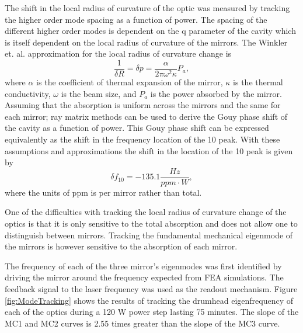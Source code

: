 The shift in the local radius of curvature of the optic was measured by 
tracking the higher order mode spacing as a function of power.  
The spacing of the different higher order modes is dependent on the q 
parameter of the cavity which is itself dependent on the local radius of 
curvature of the mirrors.  
The Winkler et. al.\cite{winkler_heating_1991} approximation for the local radius of 
curvature change is
\begin{equation}
	\frac{1}{\delta R}=\delta p=\frac{\alpha}{2\pi\omega^2\kappa}P_a,
\end{equation}
where $\alpha$ is the coefficient of thermal expansion of the mirror,  
$\kappa$ is the thermal conductivity, $\omega$ is the beam size, and 
$P_a$ is the power absorbed by the mirror.  
Assuming that the absorption is uniform across the mirrors and the same for 
each mirror; ray matrix methods can be used to derive the Gouy phase shift 
of the cavity as a function of power.  
This Gouy phase shift can be expressed equivalently as the shift in the 
frequency location of the 10 peak.  
With these assumptions and approximations the shift in the location of the 10 
peak is given by 
\begin{equation}
	\delta f_{10}=-135.1 \frac{Hz}{ppm\cdot W},
\end{equation}
where the units of ppm is per mirror rather than total.

One of the difficulties with tracking the local radius of curvature change of 
the optics is that it is only sensitive to the total absorption and does not 
allow one to distinguish between mirrors.  
Tracking the fundamental mechanical eigenmode of the mirrors is however sensitive 
to the absorption of each mirror.  

The frequency of each of the three mirror's eigenmodes was first identified by 
driving the mirror around the frequency expected from FEA simulations.  
The feedback signal to the laser frequency was used as the readout mechanism.  
Figure \ref{fig:ModeTracking} shows the results of tracking the drumhead eigenfrequency 
of each of the optics during a 120 W power step lasting 75 minutes.  
The slope of the MC1 and MC2 curves is 2.55 times greater than the slope of the 
MC3 curve.  


